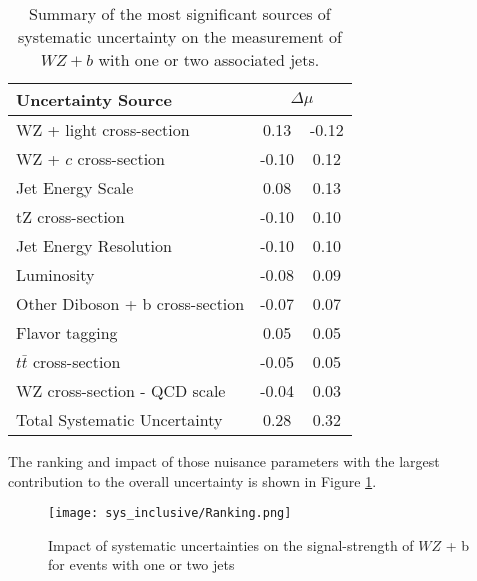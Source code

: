 \begin{table}[H]
    \centering
    \begin{tabular}{l|cc}
        \hline\hline
        Uncertainty Source & \multicolumn{2}{c}{$\Delta \mu$ }  \\
        \hline
        WZ + light cross-section & 0.13 & -0.12 \\
        WZ + $c$ cross-section & -0.10 & 0.12 \\
        Jet Energy Scale & 0.08 & 0.13 \\
        tZ cross-section & -0.10 & 0.10 \\
        Jet Energy Resolution & -0.10 & 0.10 \\
        Luminosity & -0.08 & 0.09 \\
        Other Diboson + b cross-section & -0.07 & 0.07 \\
        Flavor tagging & 0.05 & 0.05 \\
        $t\bar{t}$ cross-section & -0.05 & 0.05 \\
        WZ cross-section - QCD scale & -0.04 & 0.03 \\
        \hline
        Total Systematic Uncertainty & 0.28 & 0.32 \\
        
        \hline\hline
    \end{tabular}
    \caption{Summary of the most significant sources of systematic uncertainty on the measurement of $WZ+b$ with one or two associated jets.}
    \label{tab:systematics_inc}
\end{table}

The ranking and impact of those nuisance parameters with the largest contribution to the overall uncertainty is shown in Figure \ref{fig:ranking_inc}.

\begin{figure}[H]
    \centering
    \texttt{[image: sys\_inclusive/Ranking.png]}
    \caption{Impact of systematic uncertainties on the signal-strength of $WZ$ + b for events with one or two jets}
    \label{fig:ranking_inc}
\end{figure}

